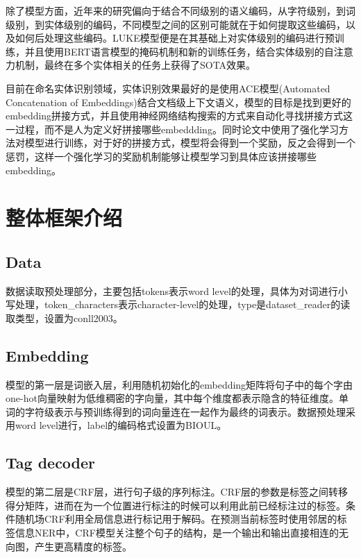 \documentclass[a4paper, 12pt]{article}
\begin{document}
除了模型方面，近年来的研究偏向于结合不同级别的语义编码，从字符级别，到词级别，到实体级别的编码，不同模型之间的区别可能就在于如何提取这些编码，以及如何后处理这些编码。LUKE模型便是在其基础上对实体级别的编码进行预训练，并且使用BERT语言模型的掩码机制和新的训练任务，结合实体级别的自注意力机制，最终在多个实体相关的任务上获得了SOTA效果。

目前在命名实体识别领域，实体识别效果最好的是使用ACE模型(Automated Concatenation of Embeddings)结合文档级上下文语义，模型的目标是找到更好的embedding拼接方式，并且使用神经网络结构搜索的方式来自动化寻找拼接方式这一过程，而不是人为定义好拼接哪些embeddding\cite{wang2021automated}。同时论文中使用了强化学习方法对模型进行训练，对于好的拼接方式，模型将会得到一个奖励，反之会得到一个惩罚，这样一个强化学习的奖励机制能够让模型学习到具体应该拼接哪些embedding。

\section{整体框架介绍} %
\label{sec:frame}

\subsection{Data} %
\label{sub:data}
数据读取预处理部分，主要包括tokens表示word level的处理，具体为对词进行小写处理，token\_characters表示character-level的处理，type是dataset\_reader的读取类型，设置为conll2003。

\subsection{Embedding} %
\label{sub:embed}

模型的第一层是词嵌入层，利用随机初始化的embedding矩阵将句子中的每个字由one-hot向量映射为低维稠密的字向量，其中每个维度都表示隐含的特征维度。单词的字符级表示与预训练得到的词向量连在一起作为最终的词表示。数据预处理采用word level进行，label的编码格式设置为BIOUL。

\subsection{Tag decoder} %
\label{sub:decoder}
模型的第二层是CRF层，进行句子级的序列标注。CRF层的参数是标签之间转移得分矩阵，进而在为一个位置进行标注的时候可以利用此前已经标注过的标签。条件随机场CRF利用全局信息进行标记用于解码。在预测当前标签时使用邻居的标签信息NER中，CRF模型关注整个句子的结构，是一个输出和输出直接相连的无向图，产生更高精度的标签。
\end{document}
